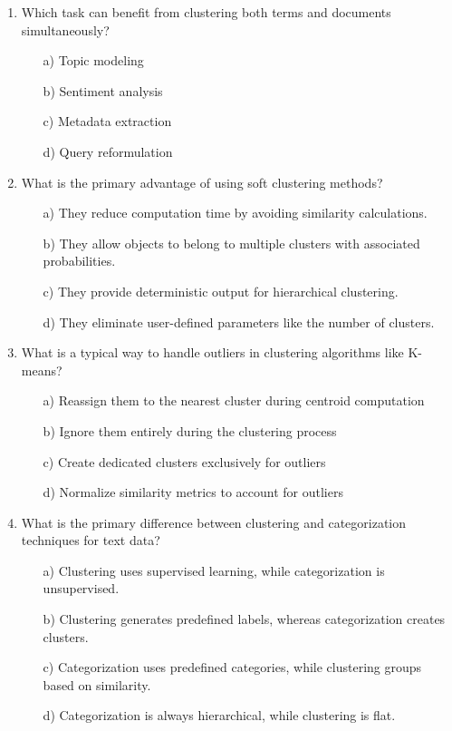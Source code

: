 \documentclass[8pt]{extarticle}
\begin{document}
\begin{multicols}{2}
\begin{enumerate}
\item Which task can benefit from clustering both terms and documents simultaneously?
\begin{itemize}
\item[a)] Topic modeling
\item[b)] Sentiment analysis
\item[c)] Metadata extraction
\item[d)] Query reformulation
\end{itemize}

\item What is the primary advantage of using soft clustering methods?
\begin{itemize}
\item[a)] They reduce computation time by avoiding similarity calculations.
\item[b)] They allow objects to belong to multiple clusters with associated probabilities.
\item[c)] They provide deterministic output for hierarchical clustering.
\item[d)] They eliminate user-defined parameters like the number of clusters.
\end{itemize}

\item What is a typical way to handle outliers in clustering algorithms like K-means?
\begin{itemize}
\item[a)] Reassign them to the nearest cluster during centroid computation
\item[b)] Ignore them entirely during the clustering process
\item[c)] Create dedicated clusters exclusively for outliers
\item[d)] Normalize similarity metrics to account for outliers
\end{itemize}

\item What is the primary difference between clustering and categorization techniques for text data?
\begin{itemize}
\item[a)] Clustering uses supervised learning, while categorization is unsupervised.
\item[b)] Clustering generates predefined labels, whereas categorization creates clusters.
\item[c)] Categorization uses predefined categories, while clustering groups based on similarity.
\item[d)] Categorization is always hierarchical, while clustering is flat.
\end{itemize}


\end{enumerate}
\end{multicols}
\end{document}
